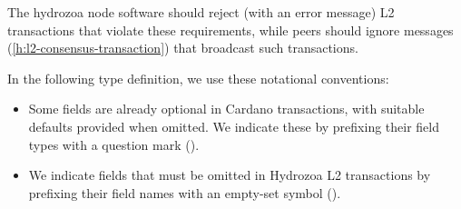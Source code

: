 \documentclass[../hydrozoa.tex]{subfiles}
\begin{document}
The hydrozoa node software should reject (with an error message) L2 transactions that violate these requirements, while peers should ignore  messages (\cref{h:l2-consensus-transaction}) that broadcast such transactions.

In the following type definition, we use these notational conventions:
\begin{itemize}
  \item Some fields are already optional in Cardano transactions, with suitable defaults provided when omitted.
  We indicate these by prefixing their field types with a question mark ().
  \item We indicate fields that must be omitted in Hydrozoa L2 transactions by prefixing their field names with an empty-set symbol (\code{$\varnothing$}).
\end{itemize}
\begingroup
\allowdisplaybreaks
\end{document}
